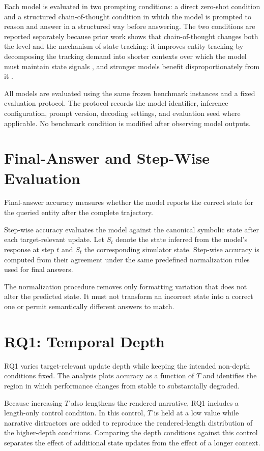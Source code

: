 \documentclass{iutbscthesis}
\begin{document}
Each model is evaluated in two prompting conditions: a direct zero-shot condition and a
structured chain-of-thought condition in which the model is prompted to reason and answer in a structured way before answering. The two
conditions are reported separately because prior work shows that chain-of-thought changes both the
level and the mechanism of state tracking: it improves entity tracking by decomposing the tracking
demand into shorter contexts over which the model must maintain state signals \cite{tang2026track},
and stronger models benefit disproportionately from it \cite{rezaee2025exploring}.

All models are evaluated using the same frozen benchmark instances and a fixed evaluation protocol.
The protocol records the model identifier, inference configuration, prompt version, decoding settings,
and evaluation seed where applicable. No benchmark condition is modified after observing model
outputs.

\section{Final-Answer and Step-Wise Evaluation}
Final-answer accuracy measures whether the model reports the correct state for the queried entity after
the complete trajectory.

Step-wise accuracy evaluates the model against the canonical symbolic state after each target-relevant
update. Let $\hat{S}_t$ denote the state inferred from the model's response at step $t$ and $S_t$ the
corresponding simulator state. Step-wise accuracy is computed from their agreement under the same
predefined normalization rules used for final answers.

The normalization procedure removes only formatting variation that does not alter the predicted state.
It must not transform an incorrect state into a correct one or permit semantically different answers to
match.

\section{RQ1: Temporal Depth}
RQ1 varies target-relevant update depth while keeping the intended non-depth conditions fixed. The
analysis plots accuracy as a function of $T$ and identifies the region in which performance changes
from stable to substantially degraded.

Because increasing $T$ also lengthens the rendered narrative, RQ1 includes a length-only control
condition. In this control, $T$ is held at a low value while narrative distractors are added to
reproduce the rendered-length distribution of the higher-depth conditions. Comparing the depth
conditions against this control separates the effect of additional state updates from the effect of
a longer context.
\end{document}
